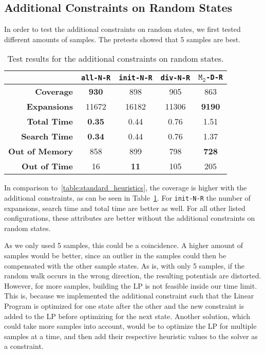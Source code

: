 \subsection{Additional Constraints on Random States}\label{subsec:additional-constraint-on-random-states}
In order to test the additional constraints on random states, we first tested different amounts of samples.
The pretests showed that 5 samples are best.

\begin{table}[h!]
    \begin{center}
        \begin{tabular}{|r|c|c|c|c|}
            \hline
            & \textbf{\texttt{all-N-R}} & \textbf{\texttt{init-N-R}} &\textbf{\texttt{div-N-R}} & \textbf{$\texttt{M}_\texttt{2}$\texttt{-D-R}} \\
            \hline \hline
            \textbf{Coverage}       & \textbf{930}  & 898           & 905   & 863 \\ \hline
            \textbf{Expansions}     & 11672         & 16182         & 11306 & \textbf{9190} \\ \hline
            \textbf{Total Time}     & \textbf{0.35} & 0.44          & 0.76  & 1.51 \\ \hline
            \textbf{Search Time}    & \textbf{0.34} & 0.44          & 0.76  & 1.37 \\ \hline
            \textbf{Out of Memory}  & 858           & 899           & 798   & \textbf{728} \\ \hline
            \textbf{Out of Time}    & 16            & \textbf{11}   & 105   & 205 \\ \hline
        \end{tabular}
        \caption{Test results for the additional constraints on random states.}
        \label{table:random-samples-constraint}
    \end{center}
\end{table}

In comparison to~\autoref{table:standard_heuristics}, the coverage is higher with the additional constraints, as can be seen in Table~\ref{table:random-samples-constraint}.
For \texttt{init-N-R} the number of expansions, search time and total time are better as well.
For all other listed configurations, these attributes are better without the additional constraints on random states.

As we only used 5 samples, this could be a coincidence.
A higher amount of samples would be better, since an outlier in the samples could then be compensated with the other sample states.
As is, with only 5 samples, if the random walk occurs in the wrong direction, the resulting potentials are distorted.
However, for more samples, building the LP is not feasible inside our time limit.
This is, because we implemented the additional constraint such that the Linear Program is optimized for one state after the other and the new constraint is added to the LP before optimizing for the next state.
Another solution, which could take more samples into account, would be to optimize the LP for multiple samples at a time, and then add their respective heuristic values to the solver as a constraint.

